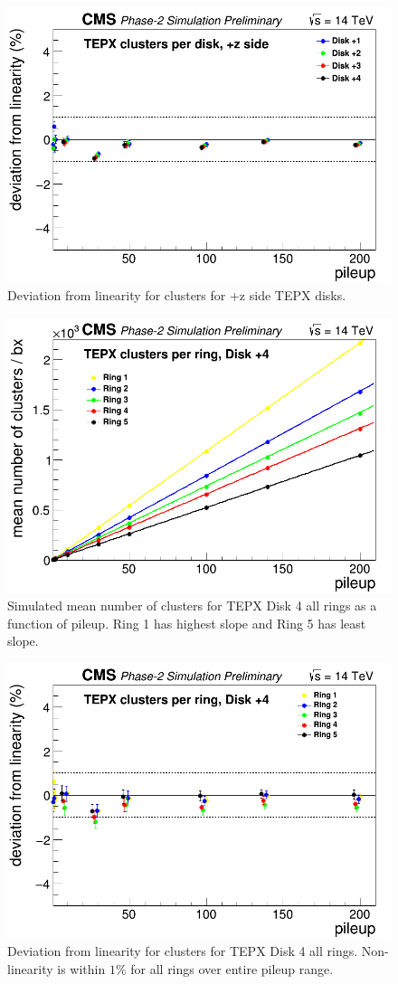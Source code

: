 \begin{figure}[H]
  \centering
  \includegraphics[width=0.5\columnwidth]{./TEPX_clusters_per_disk_postivez_Linearity_residuals.png}
  \caption{Deviation from linearity for clusters for +z side TEPX disks.}
  \label{fig:CMS}
\end{figure}

\begin{figure}[H]
  \centering
  \includegraphics[width=0.5\columnwidth]{./TEPX_clusters_per_ringDisk4_Linearity.png}
  \caption{Simulated mean number of clusters for TEPX Disk 4 all rings as a function of pileup. Ring 1 has highest slope and Ring 5 has least slope.}
  \label{fig:CMS}
\end{figure}


\begin{figure}[H]
  \centering
  \includegraphics[width=0.5\columnwidth]{./TEPX_clusters_per_ringDisk4_Linearity_residuals.png}
  \caption{Deviation from linearity for clusters for TEPX Disk 4 all rings. Non-linearity is within $1\%$ for all rings over entire pileup range.}
  \label{fig:CMS}
\end{figure}


